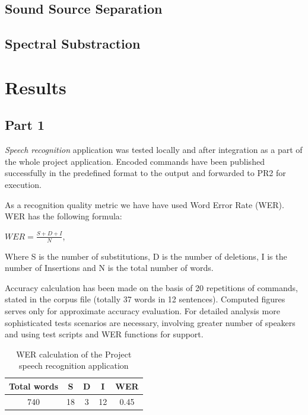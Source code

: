 \documentclass[11pt,a4paper]{report}
\begin{document}
\section{Sound Source Separation}
\section{Spectral Substraction}

\chapter {Results}
\label {sec:results}
\section {Part 1}

\textit {Speech recognition} application was tested locally and after
integration as a part of the whole project application. Encoded commands have been published successfully in the
predefined format to the output and forwarded to PR2 for execution. 

 As a
recognition quality metric we have have used Word Error Rate (WER).  WER has the
following formula:
\begin {center}
$WER=\frac {S+D+I}N$, 
\end {center}
Where S is the number of substitutions, D is the number of
deletions, I is the number of Insertions and N is the total number of words.

 Accuracy calculation has been made on the basis of 20
repetitions of commands, stated in the corpus file (totally 37 words in 12 sentences). Computed figures 
serves only for approximate accuracy evaluation.  For detailed analysis more
sophisticated tests scenarios are necessary, involving greater number of
speakers and using test scripts and WER functions for support. 
\begin {table}[h]
\begin{center}
\begin{tabular}[h]{| c || c || c ||c || c|} \hline
Total words & S & D & I  & WER\\ \hline
740 & 18 & 3 & 12 & 0.45  \\
\hline
\end{tabular}
\caption {WER calculation of the Project speech recognition application}
\label {table:WER}
\end {center}  
\end {table} 
\end{document}
